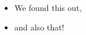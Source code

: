\cleardoublepage %
\chapter*{\abstractname}

\Blindtext

\begin{itemize}
    \item We found this out,
    \item and also that!
\end{itemize}

